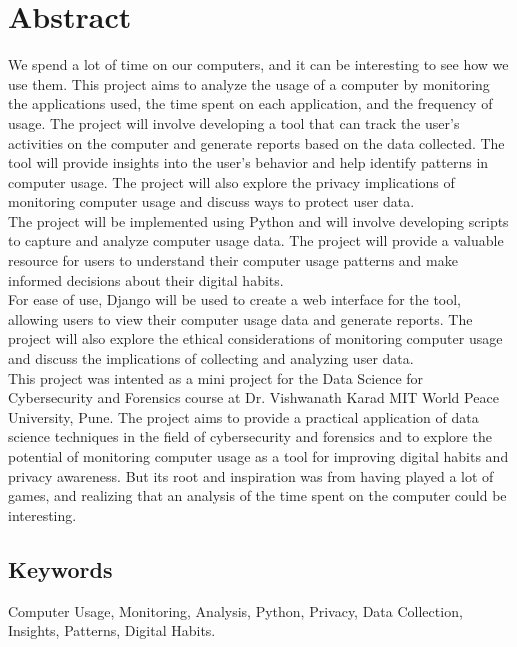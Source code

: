 \documentclass[openany]{report}
\begin{document}
\thispagestyle{empty}
\clearpage

\chapter*{Abstract}
We spend a lot of time on our computers, and it can be interesting to see how we use them. This project aims to analyze the usage of a computer by monitoring the applications used, the time spent on each application, and the frequency of usage. The project will involve developing a tool that can track the user's activities on the computer and generate reports based on the data collected. The tool will provide insights into the user's behavior and help identify patterns in computer usage. The project will also explore the privacy implications of monitoring computer usage and discuss ways to protect user data. \\

The project will be implemented using Python and will involve developing scripts to capture and analyze computer usage data. The project will provide a valuable resource for users to understand their computer usage patterns and make informed decisions about their digital habits.\\


For ease of use, Django will be used to create a web interface for the tool, allowing users to view their computer usage data and generate reports. The project will also explore the ethical considerations of monitoring computer usage and discuss the implications of collecting and analyzing user data.\\


This project was intented as a mini project for the Data Science for Cybersecurity and Forensics course at Dr. Vishwanath Karad MIT World Peace University, Pune. The project aims to provide a practical application of data science techniques in the field of cybersecurity and forensics and to explore the potential of monitoring computer usage as a tool for improving digital habits and privacy awareness. But its root and inspiration was from having played a lot of games, and realizing that an analysis of the time spent on the computer could be interesting.

\section{Keywords}
Computer Usage, Monitoring, Analysis, Python, Privacy, Data Collection, Insights, Patterns, Digital Habits.
\end{document}
